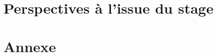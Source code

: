 \documentclass[11pt]{article}
\begin{document}
\section{Perspectives à l'issue du stage}
	

\newpage
{}
\begin{small}


\end{small}
\nocite{*}

\newpage
\fancyhead[L]{~\\}
\appendix
\section{Annexe}
	
	\newpage
	
	\newpage
	
	\newpage
	
\end{document}

